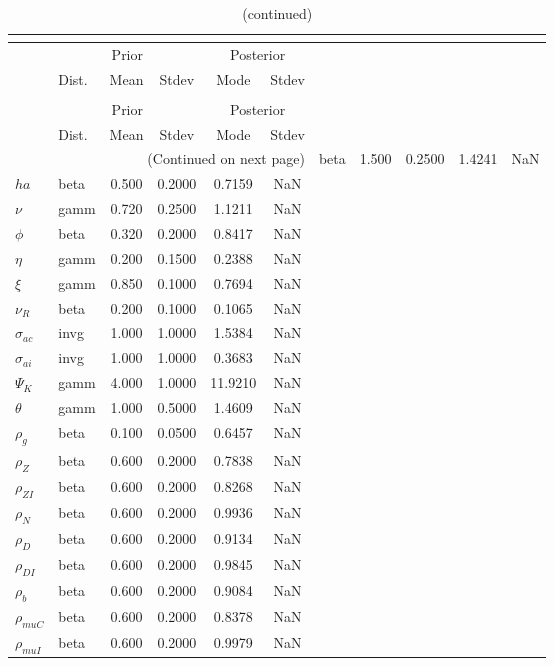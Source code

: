  
\begin{center}
\begin{longtable}{llcccc} 
\caption{Results from posterior maximization (parameters)}\\
 \label{Table:Posterior:1}\\
\toprule 
  & \multicolumn{3}{c}{Prior}  &  \multicolumn{2}{c}{Posterior} \\
  \cmidrule(r{.75em}){2-4} \cmidrule(r{.75em}){5-6}
  & Dist. & Mean  & Stdev & Mode & Stdev \\ 
\midrule \endfirsthead 
\caption{(continued)}\\
 \bottomrule 
  & \multicolumn{3}{c}{Prior}  &  \multicolumn{2}{c}{Posterior} \\
  \cmidrule(r{.75em}){2-4} \cmidrule(r{.75em}){5-6}
  & Dist. & Mean  & Stdev & Mode & Stdev \\ 
\midrule \endhead 
\bottomrule \multicolumn{6}{r}{(Continued on next page)}\endfoot 
\bottomrule\endlastfoot 
${\sigma}$ & beta &   1.500 & 0.2500 &   1.4241 &     NaN \\ 
${ha}$ & beta &   0.500 & 0.2000 &   0.7159 &     NaN \\ 
$\nu$ & gamm &   0.720 & 0.2500 &   1.1211 &     NaN \\ 
${\phi}$ & beta &   0.320 & 0.2000 &   0.8417 &     NaN \\ 
${\eta}$ & gamm &   0.200 & 0.1500 &   0.2388 &     NaN \\ 
$\xi$ & gamm &   0.850 & 0.1000 &   0.7694 &     NaN \\ 
${\nu_R}$ & beta &   0.200 & 0.1000 &   0.1065 &     NaN \\ 
${\sigma_{ac}}$ & invg &   1.000 & 1.0000 &   1.5384 &     NaN \\ 
${\sigma_{ai}}$ & invg &   1.000 & 1.0000 &   0.3683 &     NaN \\ 
${\Psi_{K}}$ & gamm &   4.000 & 1.0000 &  11.9210 &     NaN \\ 
${\theta}$ & gamm &   1.000 & 0.5000 &   1.4609 &     NaN \\ 
${\rho_g}$ & beta &   0.100 & 0.0500 &   0.6457 &     NaN \\ 
${\rho_Z}$ & beta &   0.600 & 0.2000 &   0.7838 &     NaN \\ 
${\rho_{ZI}}$ & beta &   0.600 & 0.2000 &   0.8268 &     NaN \\ 
${\rho_N}$ & beta &   0.600 & 0.2000 &   0.9936 &     NaN \\ 
${\rho_D}$ & beta &   0.600 & 0.2000 &   0.9134 &     NaN \\ 
${\rho_{DI}}$ & beta &   0.600 & 0.2000 &   0.9845 &     NaN \\ 
${\rho_b}$ & beta &   0.600 & 0.2000 &   0.9084 &     NaN \\ 
${\rho_{muC}}$ & beta &   0.600 & 0.2000 &   0.8378 &     NaN \\ 
${\rho_{muI}}$ & beta &   0.600 & 0.2000 &   0.9979 &     NaN \\ 
\end{longtable}
 \end{center}
